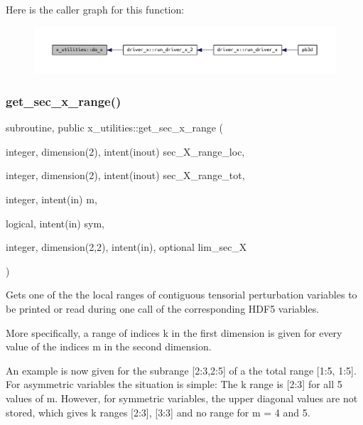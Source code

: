 Here is the caller graph for this function\+:\nopagebreak
\begin{figure}[H]
\begin{center}
\leavevmode
\includegraphics[width=350pt]{namespacex__utilities_adef8eab82f0fd670a7795c754cf9a8f9_icgraph}
\end{center}
\end{figure}
\mbox{\label{namespacex__utilities_a6072ddd1fd230758795ff320c75a1f6a}} 
\subsubsection{\texorpdfstring{get\+\_\+sec\+\_\+x\+\_\+range()}{get\_sec\_x\_range()}}
{\footnotesize\ttfamily subroutine, public x\+\_\+utilities\+::get\+\_\+sec\+\_\+x\+\_\+range (\begin{DoxyParamCaption}\item[{integer, dimension(2), intent(inout)}]{sec\+\_\+\+X\+\_\+range\+\_\+loc,  }\item[{integer, dimension(2), intent(inout)}]{sec\+\_\+\+X\+\_\+range\+\_\+tot,  }\item[{integer, intent(in)}]{m,  }\item[{logical, intent(in)}]{sym,  }\item[{integer, dimension(2,2), intent(in), optional}]{lim\+\_\+sec\+\_\+X }\end{DoxyParamCaption})}



Gets one of the the local ranges of contiguous tensorial perturbation variables to be printed or read during one call of the corresponding H\+D\+F5 variables. 

More specifically, a range of indices {\ttfamily k} in the first dimension is given for every value of the indices {\ttfamily m} in the second dimension.

An example is now given for the subrange {\ttfamily \mbox{[}2\+:3,2\+:5\mbox{]}} of a the total range {\ttfamily \mbox{[}1\+:5, 1\+:5\mbox{]}}. For asymmetric variables the situation is simple\+: The {\ttfamily k} range is {\ttfamily \mbox{[}2\+:3\mbox{]}} for all 5 values of {\ttfamily m}. However, for symmetric variables, the upper diagonal values are not stored, which gives {\ttfamily k} ranges {\ttfamily \mbox{[}2\+:3\mbox{]}}, {\ttfamily \mbox{[}3\+:3\mbox{]}} and no range for {\ttfamily m} = 4 and 5.

